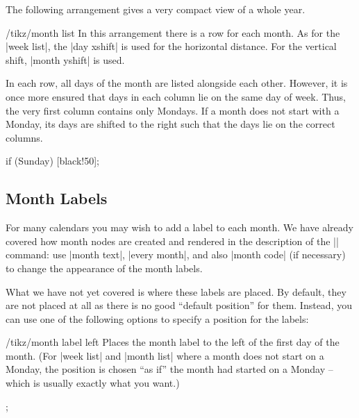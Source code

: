 The following arrangement gives a very compact view of a whole year.
%
\begin{stylekey}{/tikz/month list}
    In this arrangement there is a row for each month. As for the |week list|,
    the |day xshift| is used for the horizontal distance. For the vertical
    shift, |month yshift| is used.

    In each row, all days of the month are listed alongside each other.
    However, it is once more ensured that days in each column lie on the same
    day of week. Thus, the very first column contains only Mondays. If a month
    does not start with a Monday, its days are shifted to the right such that
    the days lie on the correct columns.
\begin{codeexample}[]
\sffamily\scriptsize
\tikz
  \calendar [dates=2000-01-01 to 2000-12-31,
             month list,month label left,month yshift=1.25em]
            if (Sunday) [black!50];
\end{codeexample}
\end{stylekey}


\subsection{Month Labels}

For many calendars you may wish to add a label to each month. We have already
covered how month nodes are created and rendered in the description of the
|\calendar| command: use |month text|, |every month|, and also |month code| (if
necessary) to change the appearance of the month labels.

What we have not yet covered is where these labels are placed. By default, they
are not placed at all as there is no good ``default position'' for them.
Instead, you can use one of the following options to specify a position for the
labels:
%
\begin{stylekey}{/tikz/month label left}
    Places the month label to the left of the first day of the month. (For
    |week list| and |month list| where a month does not start on a Monday, the
    position is chosen ``as if'' the month had started on a Monday --  which is
    usually exactly what you want.)
\begin{codeexample}[]
\tikz
  \calendar [dates=2000-01-28 to 2000-02-03,
             day list downward,month yshift=1em,
             month label left];
\end{codeexample}
\end{stylekey}

